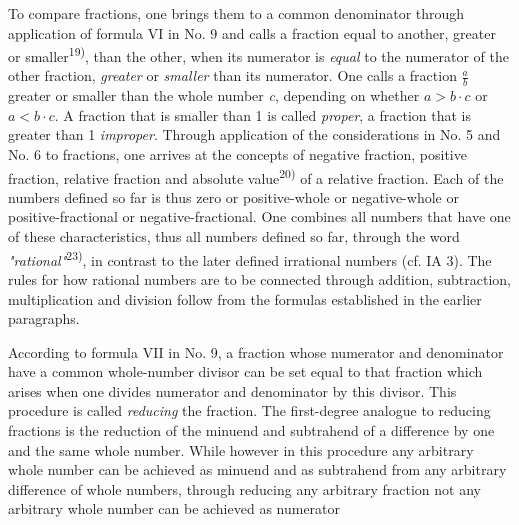 \thispagestyle{fancy}

\vspace{0.5cm}

To compare fractions, one brings them to a common denominator through application of formula VI in No. 9 and calls a fraction equal to another, greater or smaller\textsuperscript{19)}, than the other, when its numerator is \textit{equal} to the numerator of the other fraction, \textit{greater} or \textit{smaller} than its numerator. One calls a fraction $\frac{a}{b}$ greater or smaller than the whole number \textit{c}, depending on whether $\textit{a} > \textit{b} \cdot \textit{c}$ or $\textit{a} < \textit{b} \cdot \textit{c}$. A fraction that is smaller than 1 is called \textit{proper}, a fraction that is greater than 1 \textit{improper}. Through application of the considerations in No. 5 and No. 6 to fractions, one arrives at the concepts of negative fraction, positive fraction, relative fraction and absolute value\textsuperscript{20)} of a relative fraction. Each of the numbers defined so far is thus zero or positive-whole or negative-whole or positive-fractional or negative-fractional. One combines all numbers that have one of these characteristics, thus all numbers defined so far, through the word \textit{"rational"}\textsuperscript{23)}, in contrast to the later defined irrational numbers (cf. IA 3). The rules for how rational numbers are to be connected through addition, subtraction, multiplication and division follow from the formulas established in the earlier paragraphs. 

According to formula VII in No. 9, a fraction whose numerator and denominator have a common whole-number divisor can be set equal to that fraction which arises when one divides numerator and denominator by this divisor. This procedure is called \textit{reducing} the fraction. The first-degree analogue to reducing fractions is the reduction of the minuend and subtrahend of a difference by one and the same whole number. While however in this procedure any arbitrary whole number can be achieved as minuend and as subtrahend from any arbitrary difference of whole numbers, through reducing any arbitrary fraction not any arbitrary whole number can be achieved as numerator

